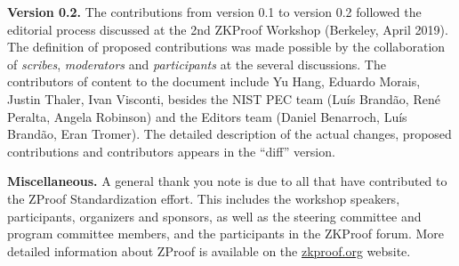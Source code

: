 \textbf{Version 0.2.}
	The contributions from version 0.1 to version 0.2 followed the editorial process discussed at the 2nd ZKProof Workshop (Berkeley, April 2019).
	The definition of proposed contributions was made possible by the collaboration of \emph{scribes}, \emph{moderators} and \emph{participants} at the several discussions.
	The contributors of content to the document include Yu Hang, Eduardo Morais, Justin Thaler, Ivan Visconti, 
besides the NIST PEC team (Luís Brandão, René Peralta, Angela Robinson) 
and the Editors team (Daniel Benarroch, Luís Brandão, Eran Tromer).
	The detailed description of the actual changes, proposed contributions and contributors appears in the ``diff'' version.



\textbf{Miscellaneous.}
	A general thank you note is due to all that have contributed to the ZProof Standardization effort.
	This includes the workshop speakers, participants, organizers and sponsors, 
as well as the steering committee and program committee members, and the participants in the ZKProof forum. 
	More detailed information about ZProof is available on the \href{https://zkproof.org/}{zkproof.org} website.

